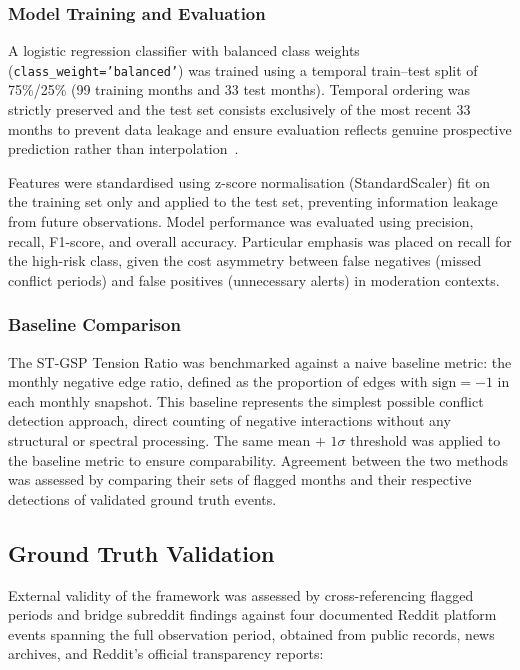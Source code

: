 \documentclass[a4paper,fleqn]{cas-dc}
\begin{document}
\subsubsection{Model Training and Evaluation}
\label{subsec:model_training}

A logistic regression classifier with balanced class weights
(\texttt{class\_weight='balanced'}) was trained using a temporal train--test split of 75\%/25\% (99 training months and 33 test months).
Temporal ordering was strictly preserved and the test set consists
exclusively of the most recent 33 months to prevent data leakage
and ensure evaluation reflects genuine prospective prediction rather
than interpolation~\cite{8_ma2025}.

Features were standardised using z-score normalisation
(StandardScaler) fit on the training set only and applied to
the test set, preventing information leakage from future observations.
Model performance was evaluated using precision, recall, F1-score, and
overall accuracy. Particular emphasis was placed on recall for the
high-risk class, given the cost asymmetry between false negatives
(missed conflict periods) and false positives (unnecessary alerts) in
moderation contexts.

\subsubsection{Baseline Comparison}
\label{subsec:baseline_comparison}

The ST-GSP Tension Ratio was benchmarked against a naive baseline
metric: the monthly negative edge ratio, defined as the proportion of
edges with $\text{sign} = -1$ in each monthly snapshot. This baseline
represents the simplest possible conflict detection approach, direct
counting of negative interactions without any structural or spectral
processing. The same mean $+$ $1\sigma$ threshold was applied to the
baseline metric to ensure comparability. Agreement between the two
methods was assessed by comparing their sets of flagged months and
their respective detections of validated ground truth events.

\subsection{Ground Truth Validation}
\label{sec:validation}

External validity of the framework was assessed by cross-referencing
flagged periods and bridge subreddit findings against four documented
Reddit platform events spanning the full observation period, obtained
from public records, news archives, and Reddit's official transparency
reports:
\end{document}
